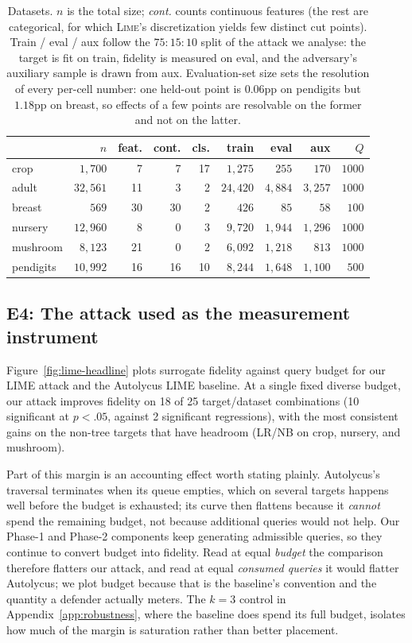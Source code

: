 \documentclass[sigconf,anonymous,review]{acmart}
\begin{document}
\begin{table}[t]
\centering
\caption{Datasets. $n$ is the total size; \emph{cont.} counts continuous features (the rest are
categorical, for which \textsc{Lime}'s discretization yields few distinct cut points). Train / eval /
aux follow the $75\!:\!15\!:\!10$ split of the attack we analyse: the target is fit on train, fidelity
is measured on eval, and the adversary's auxiliary sample is drawn from aux. Evaluation-set size sets
the resolution of every per-cell number: one held-out point is $0.06$pp on pendigits but $1.18$pp on
breast, so effects of a few points are resolvable on the former and not on the latter.}
\label{tab:datasets}
\begin{tabular}{lrrrrrrrr}
\toprule
 & $n$ & feat. & cont. & cls. & train & eval & aux & $Q$ \\
\midrule
crop      & $1{,}700$  & 7  & 7  & 17 & $1{,}275$  & $255$   & $170$   & $1000$ \\
adult     & $32{,}561$ & 11 & 3  & 2  & $24{,}420$ & $4{,}884$ & $3{,}257$ & $1000$ \\
breast    & $569$      & 30 & 30 & 2  & $426$      & $85$    & $58$    & $100$  \\
nursery   & $12{,}960$ & 8  & 0  & 3  & $9{,}720$  & $1{,}944$ & $1{,}296$ & $1000$ \\
mushroom  & $8{,}123$  & 21 & 0  & 2  & $6{,}092$  & $1{,}218$ & $813$   & $1000$ \\
pendigits & $10{,}992$ & 16 & 16 & 10 & $8{,}244$  & $1{,}648$ & $1{,}100$ & $500$  \\
\bottomrule
\end{tabular}
\end{table}

\subsection{E4: The attack used as the measurement instrument}
\label{subsec:e4}
Figure~\ref{fig:lime-headline} plots surrogate fidelity against query budget for our LIME attack
and the Autolycus LIME baseline. At a single fixed diverse budget, our attack improves fidelity on
18 of 25 target/dataset combinations (10 significant at $p{<}.05$, against 2 significant
regressions), with the most consistent gains on the non-tree targets that have headroom (LR/NB on
crop, nursery, and mushroom).

Part of this margin is an accounting effect worth stating plainly. Autolycus's traversal terminates
when its queue empties, which on several targets happens well before the budget is exhausted; its
curve then flattens because it \emph{cannot} spend the remaining budget, not because additional
queries would not help. Our Phase-1 and Phase-2 components keep generating admissible queries, so they
continue to convert budget into fidelity. Read at equal \emph{budget} the comparison therefore
flatters our attack, and read at equal \emph{consumed queries} it would flatter Autolycus; we plot
budget because that is the baseline's convention and the quantity a defender actually meters. The
$k{=}3$ control in Appendix~\ref{app:robustness}, where the baseline does spend its full budget,
isolates how much of the margin is saturation rather than better placement.
\end{document}
